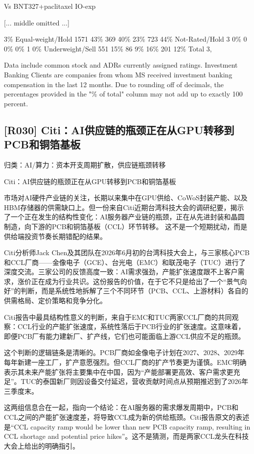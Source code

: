\documentclass[11pt]{ctexart}
\begin{document}
Vs BNT327+paclitaxel IO-exp

[... middle omitted ...]

3\% Equal-weight/Hold 1571 43\% 369 40\% 23\% 723 44\% Not-Rated/Hold 3 0\% 0 0\% 0\% 1 0\% Underweight/Sell 551 15\% 86 9\% 16\% 201 12\% Total 3,

Data include common stock and ADRs currently assigned ratings. Investment Banking Clients are companies from whom MS received investment banking compensation in the last 12 months. Due to rounding off of decimals, the percentages provided in the "\% of total" column may not add up to exactly 100 percent.

\subsection{[R030] Citi：AI供应链的瓶颈正在从GPU转移到PCB和铜箔基板}
{\small\color{refgray}归类：AI/算力：资本开支周期扩散，供应链瓶颈转移}

Citi：AI供应链的瓶颈正在从GPU转移到PCB和铜箔基板

市场对AI硬件产业链的关注，长期以来集中在GPU供给、CoWoS封装产能、以及HBM存储器的供需缺口上。但一份来自Citi近期台湾科技大会的调研纪要，揭示了一个正在发生的结构性变化：AI服务器产业链的瓶颈，正在从先进封装和晶圆制造，向下游的PCB和铜箔基板（CCL）环节转移。 这不是一个短期扰动，而是供给端投资节奏长期错配的结果。

Citi分析师Jack Chen及其团队在2026年6月初的台湾科技大会上，与三家核心PCB和CCL厂商——金像电子（GCE）、台光电（EMC）和联茂电子（TUC）进行了深度交流。三家公司的反馈高度一致：AI需求强劲，产能扩张速度跟不上客户需求，涨价正在成为行业共识。这份报告的价值，在于它不只是给出了一个“景气向好”的判断，而是系统性地拆解了三个不同环节（PCB、CCL、上游材料）各自的供需格局、定价策略和竞争分化。

Citi报告中最具结构性意义的判断，来自于EMC和TUC两家CCL厂商的共同观察：CCL行业的产能扩张速度，系统性落后于PCB行业的扩张速度。这意味着，即便PCB厂有能力建新厂、扩产线，它们也可能面临上游CCL供应不足的瓶颈。

这个判断的逻辑链条是清晰的。PCB厂商如金像电子计划在2027、2028、2029年每年新建一座工厂，扩产意愿强烈。但CCL厂商的扩产节奏更为谨慎。EMC明确表示其未来产能扩张将主要集中在中国，因为“产能部署更高效、客户需求更充足”。TUC的泰国新厂则因设备交付延迟，营收贡献时间点从预期推迟到了2026年三季度末。

这两组信息合在一起，指向一个结论：在AI服务器的需求爆发周期中，PCB和CCL之间的产能扩张速度差，将导致CCL成为新的供给瓶颈。Citi报告原文的表述是“CCL capacity ramp would be lower than new PCB capacity ramp, resulting in CCL shortage and potential price hikes”。这不是猜测，而是两家CCL龙头在科技大会上给出的明确指引。
\end{document}

